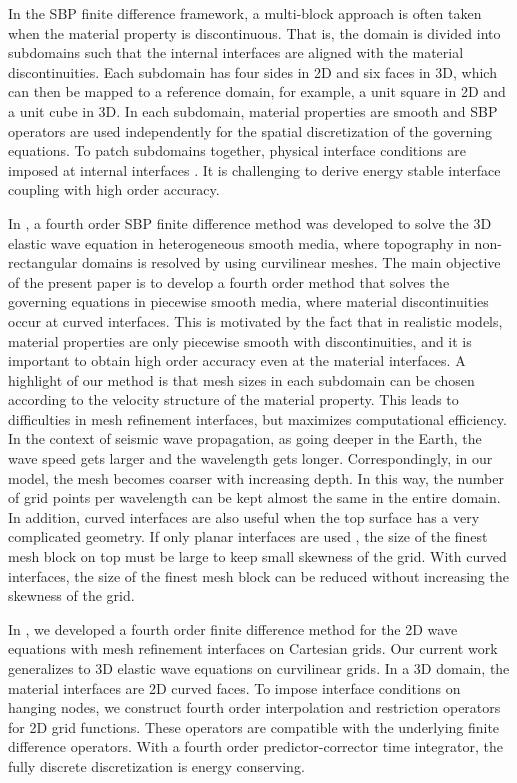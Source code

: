 In the SBP finite difference framework, a multi-block approach is often taken when the material property is discontinuous. That is, the domain is divided into subdomains such that the internal interfaces are aligned with the material discontinuities. Each subdomain has four sides in 2D and six faces in 3D, which can then be mapped to a reference domain, for example, a unit square in 2D and a unit cube in 3D. In each subdomain, material properties are smooth and SBP operators are used independently for the spatial discretization of the governing equations. To patch subdomains together, physical interface conditions are imposed at internal interfaces \cite{Almquist2019,duru2014stable}. It is challenging to derive energy stable interface coupling with high order accuracy. 

In \cite{petersson2015wave}, a fourth order SBP finite difference method was developed to solve the 3D elastic wave equation in heterogeneous smooth media, where topography in non-rectangular domains is resolved by using curvilinear meshes. The main objective of the present paper is to develop a fourth order method that solves the governing equations in piecewise smooth media, where material discontinuities occur at curved interfaces.   This is motivated by the fact that in realistic models, material properties are only piecewise smooth with discontinuities, and it is important to obtain high order accuracy even at the material interfaces. A highlight of our method is that mesh sizes in each subdomain can be chosen according to the velocity structure of the material property. This leads to difficulties in mesh refinement interfaces, but maximizes computational efficiency. In the context of seismic wave propagation, as going deeper in the Earth, the wave speed gets larger and the wavelength gets longer. Correspondingly, in our model, the mesh becomes coarser with increasing depth. In this way, the number of grid points per wavelength can be kept almost the same in the entire domain. In addition, curved interfaces are also useful when the top surface has a very complicated geometry. If only planar interfaces are used \cite{SW4}, the size of the finest mesh block on top must be large to keep small skewness of the grid. With curved interfaces, the size of the finest mesh block can be reduced without increasing the skewness of the grid. 

In \cite{wang2018fourth}, we developed a fourth order finite difference method for the 2D wave equations with mesh refinement interfaces on Cartesian grids. Our current work generalizes to 3D elastic wave equations on curvilinear grids. In a 3D domain, the material interfaces are 2D curved faces. To impose interface conditions on hanging nodes, we construct fourth order interpolation and restriction operators for 2D grid functions. These operators are compatible with the underlying finite difference operators. With a fourth order predictor-corrector time integrator, the fully discrete discretization is energy conserving. 

